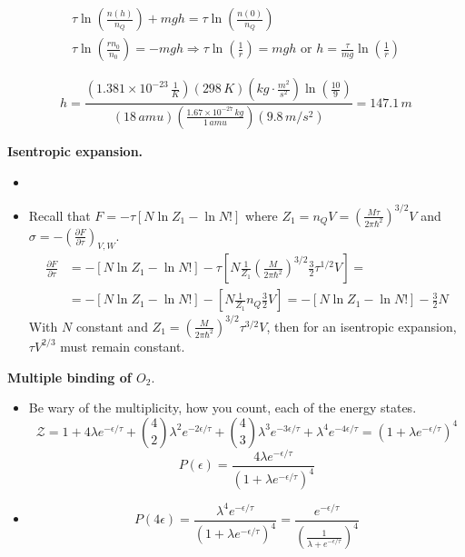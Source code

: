 \[
\begin{gathered}
  \tau \ln{ \left( \frac{ n(h)}{ n_Q} \right) } + mgh = \tau \ln{ \left( \frac{n(0)}{n_Q } \right)} \\ 
  \tau \ln{ \left( \frac{ r n_0}{n_0} \right) } = - mgh \Longrightarrow \tau \ln{ \left( \frac{1}{r} \right) } = mgh \text{ or } h = \frac{ \tau}{mg} \ln{ \left( \frac{1}{r} \right) }
\end{gathered}
\]

\[
h  = \frac{ ( 1.381 \times 10^{-23} \, \frac{1}{K} )(298 \, K)( kg\cdot \frac{m^2}{s^2} ) \ln{ \left( \frac{10}{9} \right) } }{ (18 \, amu )\left( \frac{1.67 \times 10^{-27} \, kg}{ 1 \, amu} \right)(9.8 \, m/s^2) } = 147.1 \, m 
\]

 \textbf{Isentropic expansion.}  
\begin{itemize}
\item[(a)]
\item[(b)] Recall that $F = - \tau [ N \ln{Z_1} - \ln{N!} ]$ where $Z_1 = n_Q V = \left( \frac{ M \tau}{ 2\pi \hbar^2 } \right)^{3/2} V$ and \\
$\sigma = -\left( \frac{ \partial F}{ \partial \tau} \right)_{V,W}$.  
\[
\begin{aligned}
  \frac{ \partial F}{ \partial \tau} & = - [ N \ln{Z_1} - \ln{N!} ] - \tau [ N \frac{1}{Z_1} \left( \frac{ M }{ 2\pi \hbar^2 } \right)^{3/2} \frac{3}{2} \tau^{1/2} V ] = \\
  & = - [  N \ln{Z_1} - \ln{N!} ] - [ N \frac{1}{Z_1} n_Q \frac{3}{2} V ] = - [ N \ln{Z_1} - \ln{N!} ] - \frac{3}{2} N
\end{aligned}
\]
With $N$ constant and $Z_1 = \left( \frac{M}{ 2\pi \hbar^2 } \right)^{3/2} \tau^{3/2} V$, then for an isentropic expansion, $\tau V^{2/3}$ must remain constant.  

\end{itemize}

 \textbf{Multiple binding of $O_2$}.  

\begin{itemize}
\item[(a)] Be wary of the multiplicity, how you count, each of the energy states.  
\[
\mathcal{Z} = 1 + 4 \lambda e^{-\epsilon/\tau} + \binom{4}{2} \lambda^2 e^{-2\epsilon/\tau} + \binom{4}{3} \lambda^3 e^{-3\epsilon/\tau} + \lambda^4 e^{-4\epsilon/\tau} = (1 + \lambda e^{-\epsilon/\tau})^4
\]
\[
\boxed{ P(\epsilon ) = \frac{ 4 \lambda e^{-\epsilon/\tau}}{ (1 + \lambda e^{-\epsilon/\tau})^4} }
\]
\item[(b)] \[
P(4\epsilon) = \frac{ \lambda^4 e^{-\epsilon/\tau}}{ (1+ \lambda e^{-\epsilon/ \tau})^4} = \frac{ e^{-\epsilon /\tau}}{ \left( \frac{1}{\lambda + e^{-\epsilon/ \tau} } \right)^4}
\]
\end{itemize}







